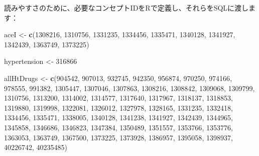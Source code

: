 \documentclass[
  11pt]{book}
\newenvironment{Shaded}{\begin{snugshade}}{\end{snugshade}}
\newcommand{\DecValTok}[1]{\textcolor[rgb]{0.00,0.00,0.81}{#1}}
\newcommand{\FunctionTok}[1]{\textcolor[rgb]{0.13,0.29,0.53}{\textbf{#1}}}
\newcommand{\NormalTok}[1]{#1}
\newcommand{\OtherTok}[1]{\textcolor[rgb]{0.56,0.35,0.01}{#1}}
\theoremstyle{definition}
\theoremstyle{definition}
\theoremstyle{definition}
\theoremstyle{definition}
\theoremstyle{remark}
\begin{document}
読みやすさのために、必要なコンセプトIDをRで定義し、それらをSQLに渡します：

\begin{Shaded}
\begin{Highlighting}[]
\NormalTok{aceI }\OtherTok{\textless{}{-}} \FunctionTok{c}\NormalTok{(}\DecValTok{1308216}\NormalTok{, }\DecValTok{1310756}\NormalTok{, }\DecValTok{1331235}\NormalTok{, }\DecValTok{1334456}\NormalTok{, }\DecValTok{1335471}\NormalTok{, }\DecValTok{1340128}\NormalTok{, }\DecValTok{1341927}\NormalTok{,}
          \DecValTok{1342439}\NormalTok{, }\DecValTok{1363749}\NormalTok{, }\DecValTok{1373225}\NormalTok{)}

\NormalTok{hypertension }\OtherTok{\textless{}{-}} \DecValTok{316866}

\NormalTok{allHtDrugs }\OtherTok{\textless{}{-}} \FunctionTok{c}\NormalTok{(}\DecValTok{904542}\NormalTok{, }\DecValTok{907013}\NormalTok{, }\DecValTok{932745}\NormalTok{, }\DecValTok{942350}\NormalTok{, }\DecValTok{956874}\NormalTok{, }\DecValTok{970250}\NormalTok{, }\DecValTok{974166}\NormalTok{,}
                  \DecValTok{978555}\NormalTok{, }\DecValTok{991382}\NormalTok{, }\DecValTok{1305447}\NormalTok{, }\DecValTok{1307046}\NormalTok{, }\DecValTok{1307863}\NormalTok{, }\DecValTok{1308216}\NormalTok{,}
                  \DecValTok{1308842}\NormalTok{, }\DecValTok{1309068}\NormalTok{, }\DecValTok{1309799}\NormalTok{, }\DecValTok{1310756}\NormalTok{, }\DecValTok{1313200}\NormalTok{, }\DecValTok{1314002}\NormalTok{,}
                  \DecValTok{1314577}\NormalTok{, }\DecValTok{1317640}\NormalTok{, }\DecValTok{1317967}\NormalTok{, }\DecValTok{1318137}\NormalTok{, }\DecValTok{1318853}\NormalTok{, }\DecValTok{1319880}\NormalTok{,}
                  \DecValTok{1319998}\NormalTok{, }\DecValTok{1322081}\NormalTok{, }\DecValTok{1326012}\NormalTok{, }\DecValTok{1327978}\NormalTok{, }\DecValTok{1328165}\NormalTok{, }\DecValTok{1331235}\NormalTok{,}
                  \DecValTok{1332418}\NormalTok{, }\DecValTok{1334456}\NormalTok{, }\DecValTok{1335471}\NormalTok{, }\DecValTok{1338005}\NormalTok{, }\DecValTok{1340128}\NormalTok{, }\DecValTok{1341238}\NormalTok{,}
                  \DecValTok{1341927}\NormalTok{, }\DecValTok{1342439}\NormalTok{, }\DecValTok{1344965}\NormalTok{, }\DecValTok{1345858}\NormalTok{, }\DecValTok{1346686}\NormalTok{, }\DecValTok{1346823}\NormalTok{,}
                  \DecValTok{1347384}\NormalTok{, }\DecValTok{1350489}\NormalTok{, }\DecValTok{1351557}\NormalTok{, }\DecValTok{1353766}\NormalTok{, }\DecValTok{1353776}\NormalTok{, }\DecValTok{1363053}\NormalTok{,}
                  \DecValTok{1363749}\NormalTok{, }\DecValTok{1367500}\NormalTok{, }\DecValTok{1373225}\NormalTok{, }\DecValTok{1373928}\NormalTok{, }\DecValTok{1386957}\NormalTok{, }\DecValTok{1395058}\NormalTok{,}
                  \DecValTok{1398937}\NormalTok{, }\DecValTok{40226742}\NormalTok{, }\DecValTok{40235485}\NormalTok{)}
\end{Highlighting}
\end{Shaded}
\end{document}
